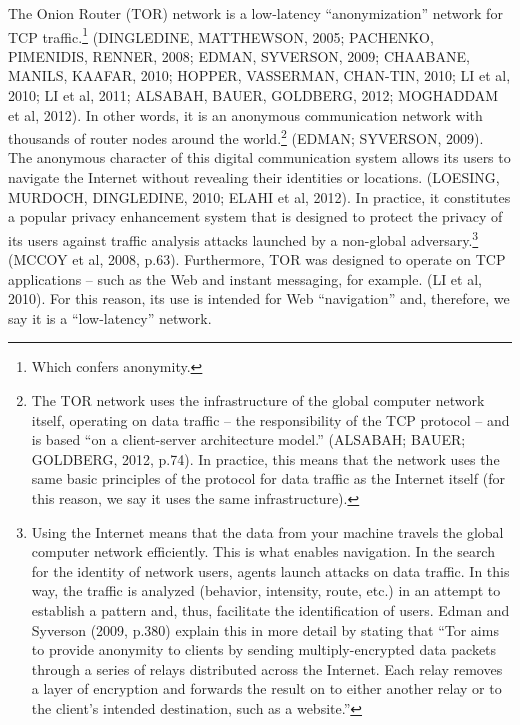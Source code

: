 The Onion Router (TOR) network is a low-latency ``anonymization'' network for TCP traffic.\footnote{Which confers anonymity.} (DINGLEDINE, MATTHEWSON, 2005; PACHENKO, PIMENIDIS, RENNER, 2008; EDMAN, SYVERSON, 2009; CHAABANE, MANILS, KAAFAR, 2010; HOPPER, VASSERMAN, CHAN-TIN, 2010; LI et al, 2010; LI et al, 2011; ALSABAH, BAUER, GOLDBERG, 2012; MOGHADDAM et al, 2012). In other words, it is an anonymous communication network with thousands of router nodes around the world.\footnote{The TOR network uses the infrastructure of the global computer network itself, operating on data traffic -- the responsibility of the TCP protocol -- and is based ``on a client-server architecture model.'' (ALSABAH; BAUER; GOLDBERG, 2012, p.74). In practice, this means that the network uses the same basic principles of the protocol for data traffic as the Internet itself (for this reason, we say it uses the same infrastructure).} (EDMAN; SYVERSON, 2009). The anonymous character of this digital communication system allows its users to navigate the Internet without revealing their identities or locations. (LOESING, MURDOCH, DINGLEDINE, 2010; ELAHI et al, 2012). In practice, it constitutes a popular privacy enhancement system that is designed to protect the privacy of its users against traffic analysis attacks launched by a non-global adversary.\footnote{Using the Internet means that the data from your machine travels the global computer network efficiently. This is what enables navigation. In the search for the identity of network users, agents launch attacks on data traffic. In this way, the traffic is analyzed (behavior, intensity, route, etc.) in an attempt to establish a pattern and, thus, facilitate the identification of users. Edman and Syverson (2009, p.380) explain this in more detail by stating that ``Tor aims to provide anonymity to clients by sending multiply-encrypted data packets through a series of relays distributed across the Internet. Each relay removes a layer of encryption and forwards the result on to either another relay or to the client's intended destination, such as a website.''} (MCCOY et al, 2008, p.63). Furthermore, TOR was designed to operate on TCP applications -- such as the Web and instant messaging, for example. (LI et al, 2010). For this reason, its use is intended for Web ``navigation'' and, therefore, we say it is a ``low-latency'' network.

